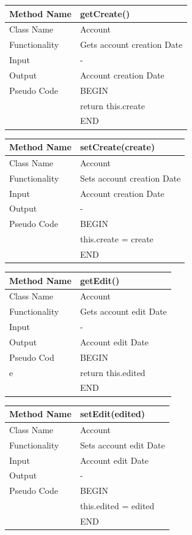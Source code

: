 \documentclass[12pt]{article}
\begin{document}
\begin{tabular}{ |p{3cm}||p{\colWidth}|  }
	\hline
	Method Name &  getCreate()\\
	\hline
	Class Name & Account\\
	\hline
	Functionality & Gets account creation Date\\
	\hline
	Input & -\\
	\hline
	Output & Account creation Date\\
	\hline
	Pseudo Code&BEGIN\\ & return this.create\\&END\\
	\hline
\end{tabular}

\begin{tabular}{ |p{3cm}||p{\colWidth}|  }
	\hline
	Method Name &  setCreate(create)\\
	\hline
	Class Name & Account\\
	\hline
	Functionality & Sets account creation Date\\
	\hline
	Input & Account creation Date\\
	\hline
	Output & -\\
	\hline
	Pseudo Code&BEGIN\\ & this.create = create\\&END\\
	\hline
\end{tabular}

\begin{tabular}{ |p{3cm}||p{\colWidth}|  }
	\hline
	Method Name &  getEdit()\\
	\hline
	Class Name & Account\\
	\hline
	Functionality & Gets account edit Date\\
	\hline
	Input & -\\
	\hline
	Output & Account edit Date\\
	\hline
	Pseudo Cod&BEGIN\\e & return this.edited\\&END\\
	\hline
\end{tabular}

\begin{tabular}{ |p{3cm}||p{\colWidth}|  }
	\hline
	Method Name &  setEdit(edited)\\
	\hline
	Class Name & Account\\
	\hline
	Functionality & Sets account edit Date\\
	\hline
	Input & Account edit Date\\
	\hline
	Output & -\\
	\hline
	Pseudo Code&BEGIN\\ & this.edited = edited\\&END\\
	\hline
\end{tabular}
\end{document}
